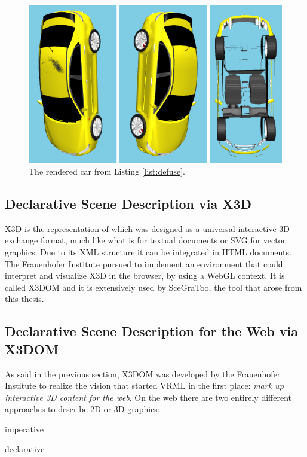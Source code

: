 \begin{figure}
  \centering
  \includegraphics[width=\textwidth]{../assets/car.png}
  \caption{The rendered car from Listing \ref{list:defuse}.}
  \label{fig:defuse}
\end{figure}


\subsection{Declarative Scene Description via X3D}
\label{x3d} \gls{X3D} \cite{x3d} is the  representation of  which was designed as a
universal interactive \gls{3D} exchange format, much like what  is for textual
documents or \acrshort{SVG} for vector graphics. Due to its \gls{XML} structure it can be
integrated in \gls{HTML} documents. The Frauenhofer Institute pursued to
implement an environment that could interpret and visualize \gls{X3D} in the browser, by
using a \gls{WebGL} context. It is called X3DOM \cite{x3dom} and it is extensively used
by SceGraToo, the tool that arose from this thesis.

\subsection{Declarative Scene Description for the Web via X3DOM}
\label{par:x3dom}

As said in the previous section, X3DOM was developed by the Frauenhofer
Institute to realize the vision that started \gls{VRML} in the first place: \emph{mark
up interactive \gls{3D} content for the web}. On the web there are two entirely
different approaches to describe 2D or 3D graphics:

\begin{itemize*}
  \item imperative
  \item declarative
\end{itemize*}

